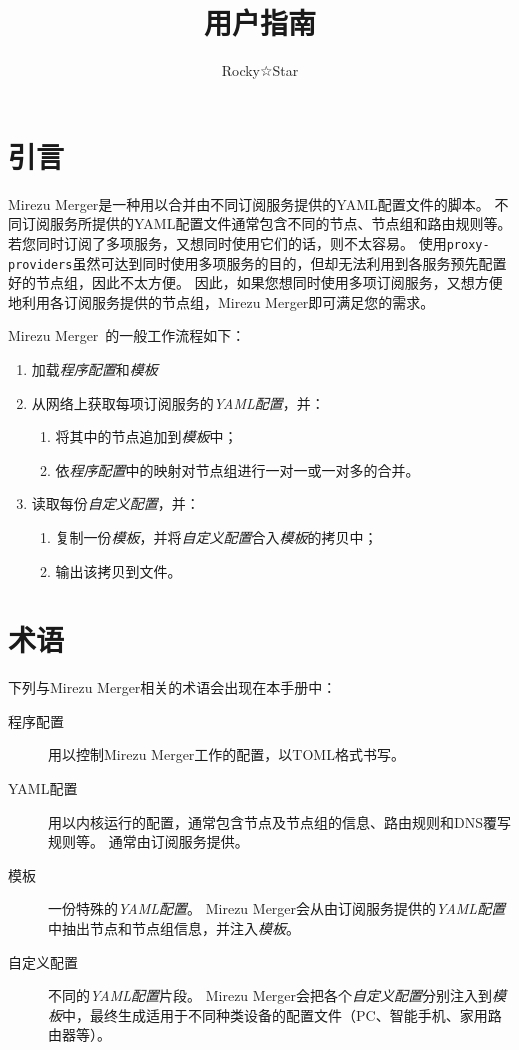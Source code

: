 \documentclass[a4paper,fontset=founder,punct=kaiming]{ctexart}
\title{\productname 用户指南}
\author{Rocky☆Star}
\renewcommand\_{\textunderscore\linebreak[1]}
\newcommand{\productname}{Mirezu Merger}
\begin{document}
\maketitle

\section{引言}
\label{sec:intro}

\productname 是一种用以合并由不同订阅服务提供的YAML配置文件的脚本。
不同订阅服务所提供的YAML配置文件通常包含不同的节点、节点组和路由规则等。
若您同时订阅了多项服务，又想同时使用它们的话，则不太容易。
使用\texttt{proxy-providers}虽然可达到同时使用多项服务的目的，但却无法利用到各服务预先配置好的节点组，因此不太方便。
因此，如果您想同时使用多项订阅服务，又想方便地利用各订阅服务提供的节点组，\productname 即可满足您的需求。

\productname\ 的一般工作流程如下：
\begin{enumerate}
\item 加载\emph{程序配置}和\emph{模板}
\item 从网络上获取每项订阅服务的\emph{YAML配置}，并：
  \begin{enumerate}
  \item 将其中的节点追加到\emph{模板}中；
  \item 依\emph{程序配置}中的映射对节点组进行一对一或一对多的合并。
  \end{enumerate}
\item 读取每份\emph{自定义配置}，并：
  \begin{enumerate}
  \item 复制一份\emph{模板}，并将\emph{自定义配置}合入\emph{模板}的拷贝中；
  \item 输出该拷贝到文件。
  \end{enumerate}
\end{enumerate}

\section{术语}
\label{sec:terms}

下列与\productname 相关的术语会出现在本手册中：
\begin{description}
\item[程序配置] 用以控制\productname 工作的配置，以TOML格式书写。
\item[YAML配置] 用以内核运行的配置，通常包含节点及节点组的信息、路由规则和DNS覆写规则等。
  通常由订阅服务提供。
\item[模板] 一份特殊的\emph{YAML配置}。
  \productname 会从由订阅服务提供的\emph{YAML配置}中抽出节点和节点组信息，并注入\emph{模板}。
\item[自定义配置] 不同的\emph{YAML配置}片段。
  \productname 会把各个\emph{自定义配置}分别注入到\emph{模板}中，最终生成适用于不同种类设备的配置文件（PC、智能手机、家用路由器等）。
\end{description}
\end{document}
